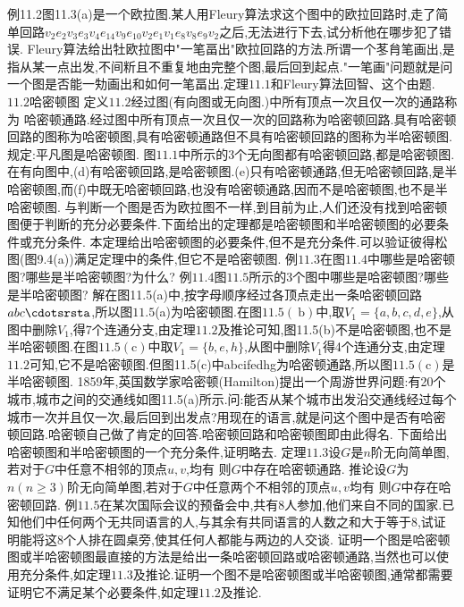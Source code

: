 例11.2图11.3(a)是一个欧拉图.某人用Fleury算法求这个图中的欧拉回路时,走了简单回路$v_{2}e_{2}v_{3}e_{3}v_{4}e_{14}v_{9}e_{10}v_{2}e_{1}v_{1}e_{8}v_{8}e_{9}v_{2}$之后,无法进行下去,试分析他在哪步犯了错误.
Fleury算法给出牡欧拉图中"一笔畐出"欧拉回路的方法.所谓一个苳䏍笔画出,是指从某一点出发,不间䉼且不重复地甶完整个图,最后回到起点."$一$笔画"问题就是问一个图是否能一劮画出和如何一笔畐出.定理$11.1$和Fleury算法回智、这个由题.
{$11.2$哈密顿图}
定义$11.2$经过图(有向图或无向图.)中所有顶点一次且仅一次的通路称为
哈密顿通路.经过图中所有顶点一次且仅一次的回路称为哈密顿回路.具有哈密顿回路的图称为哈密顿图,具有哈密顿通路但不具有哈密顿回路的图称为半哈密顿图.
规定:平凡图是哈密顿图.
图$11.1$中所示的3个无向图都有哈密顿回路,都是哈密顿图.在有向图中,(d)有哈密顿回路,是哈密顿图.(e)只有哈密顿通路,但无哈密顿回路,是半哈密顿图,而(f)中既无哈密顿回路,也没有哈密顿通路,因而不是哈密顿图,也不是半哈密顿图.
与判断一个图是否为欧拉图不一样,到目前为止,人们还没有找到哈密顿图便于判断的充分必要条件.下面给出的定理都是哈密顿图和半哈密顿图的必要条件或充分条件.
本定理给出哈密顿图的必要条件,但不是充分条件.可以验证彼得松图(图9.4(a))满足定理中的条件,但它不是哈密顿图.
例$\mathbf{11.3}$在图$11.4$中哪些是哈密顿图?哪些是半哈密顿图?为什么?
例$11.4$图$11.5$所示的3个图中哪些是哈密顿图?哪些是半哈密顿图?
解在图11.5(a)中,按字母顺序经过各顶点走出一条哈密顿回路$abc\cdotsrsta$,所以图$11.5$(a)为哈密顿图.在图$11.5(\mathrm{~b})$中,取$V_{1}=\{a,b,c,d,e\}$,从图中删除$V_{1}$,得7个连通分支,由定理$11.2$及推论可知,图11.5(b)不是哈密顿图,也不是半哈密顿图.在图$11.5(\mathrm{c})$中取$V_{1}=\{b,e,h\}$,从图中删除$V_{1}$得4个连通分支,由定理$11.2$可知,它不是哈密顿图.但图11.5(c)中abcifedhg为哈密顿通路,所以图$11.5(\mathrm{c})$是半哈密顿图.
1859年,英国数学家哈密顿(Hamilton)提出一个周游世界问题:有20个城市,城市之间的交通线如图11.5(a)所示.问:能否从某个城市出发沿交通线经过每个城市一次并且仅一次,最后回到出发点?用现在的语言,就是问这个图中是否有哈密顿回路.哈密顿自己做了肯定的回答.哈密顿回路和哈密顿图即由此得名.
下面给出哈密顿图和半哈密顿图的一个充分条件,证明略去.
定理$11.3$设$G$是$n$阶无向简单图,若对于$G$中任意不相邻的顶点$u,v$,均有
则$G$中存在哈密顿通路.
推论设$G$为$n(n\geqslant3)$阶无向简单图,若对于$G$中任意两个不相邻的顶点$u,v$均有
则$G$中存在哈密顿回路.
例$11.5$在某次国际会议的预备会中,共有8人参加,他们来自不同的国家.已知他们中任何两个无共同语言的人,与其余有共同语言的人数之和大于等于8,试证明能将这8个人排在圆桌旁,使其任何人都能与两边的人交谈.
证明一个图是哈密顿图或半哈密顿图最直接的方法是给出一条哈密顿回路或哈密顿通路,当然也可以使用充分条件,如定理$11.3$及推论.证明一个图不是哈密顿图或半哈密顿图,通常都需要证明它不满足某个必要条件,如定理$11.2$及推论.
